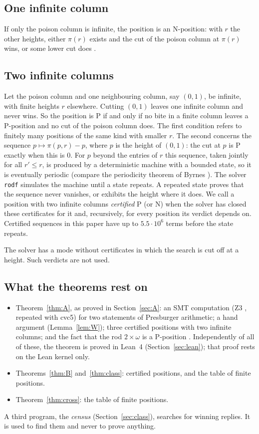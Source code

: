 \documentclass[11pt]{amsart}
\theoremstyle{definition}
\theoremstyle{remark}
\begin{document}
\subsection{One infinite column}
If only the poison column is infinite, the position is an N-position: with $r$ the other
heights, either $\pi(r)$ exists and the cut of the poison column at $\pi(r)$ wins, or some
lower cut does \cite{HS,Gale}.

\subsection{Two infinite columns}\label{sec:two}
Let the poison column and one neighbouring column, say $(0,1)$, be infinite, with finite
heights $r$ elsewhere. Cutting $(0,1)$ leaves one infinite column and never wins. So the
position is P if and only if no bite in a finite column leaves a P-position and no cut of the
poison column does. The first condition refers to finitely many positions of the same kind
with smaller $r$. The second concerns the sequence $p\mapsto\pi(p,r)-p$, where $p$ is the
height of $(0,1)$: the cut at $p$ is P exactly when this is $0$. For $p$ beyond the entries of
$r$ this sequence, taken jointly for all $r'\le r$, is produced by a deterministic machine
with a bounded state, so it is eventually periodic (compare the periodicity theorem of
Byrnes \cite{By}). The solver \texttt{rodf} simulates the machine until a state repeats. A
repeated state proves that the sequence never vanishes, or exhibits the height where it does.
We call a position with two infinite columns \emph{certified} P (or N) when the solver has
closed these certificates for it and, recursively, for every position its verdict depends on.
Certified sequences in this paper have up to $5.5\cdot10^6$ terms before the state repeats.

The solver has a mode without certificates in which the search is cut off at a height. Such
verdicts are not used.

\subsection{What the theorems rest on}
\begin{itemize}
\item Theorem~\ref{thm:A}, as proved in Section~\ref{sec:A}: an SMT computation (Z3 \cite{Z3},
repeated with cvc5) for two statements of Presburger arithmetic; a hand argument
(Lemma~\ref{lem:W}); three certified positions with two infinite columns; and the fact that
the rod $2\times\omega$ is a P-position \cite{HS}. Independently of all of these, the theorem
is proved in Lean~4 (Section~\ref{sec:lean}); that proof rests on the Lean kernel only.
\item Theorems~\ref{thm:B} and~\ref{thm:class}: certified positions, and the table of finite
positions.
\item Theorem~\ref{thm:cross}: the table of finite positions.
\end{itemize}
A third program, the \emph{census} (Section~\ref{sec:class}), searches for winning replies. It
is used to find them and never to prove anything.
\end{document}
